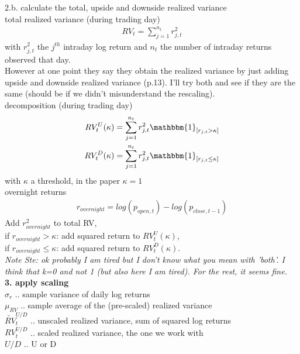 \documentclass{article}
\begin{document}
2.b. calculate the total, upside and downside realized variance\\

total realized variance (during trading day)
\begin{align*}
RV_{t} = \sum_{j = 1}^{n_{t}} r_{j,t}^{2}
\end{align*}
with $r_{j,t}^{2}$ the $j^{th}$ intraday log return and $n_{t}$ the number of intraday returns observed that day. \\

However at one point they say they obtain the realized variance by just adding upside and downside realized variance (p.13). I'll try both and see if they are the same (should be if we didn't misunderstand the rescaling). \\

decomposition (during trading day)
\begin{align*}
RV_{t}^{U}(\kappa) = \sum_{j=1}^{n_{t}} r_{j,t}^{2} \mathbbm{1}_{[r_{j,t} > \kappa]}\\
RV_{t}^{D}(\kappa) = \sum_{j=1}^{n_{t}} r_{j,t}^{2} \mathbbm{1}_{[r_{j,t} \leq \kappa]}
\end{align*}
with $\kappa$ a threshold, in the paper $\kappa = 1$\\

overnight returns
\begin{align*}
r_{overnight} = log(p_{open,t}) - log(p_{close, t-1})
\end{align*}
Add $r_{overnight}^{2}$ to total RV, \\
if $r_{overnight} > \kappa$: add squared return to $RV_{t}^{U}(\kappa)$, \\
if $r_{overnight} \leq \kappa$: add squared return to $RV_{t}^{D}(\kappa)$. \\

\textit{Note Ste:  ok probably I am tired but I don't know what you mean with 'both'. I think that k=0 and not 1 (but also here I am tired). For the rest, it seems fine.}\\


\textbf{3. apply scaling}\\

$\sigma_{r}$ .. sample variance of daily log returns\\
$\mu_{RV}$  .. sample average of the (pre-scaled) realized variance\\
$\tilde{RV}_{t}^{U/D}$ .. unscaled realized variance, sum of squared log returns\\
$RV_{t}^{U/D}$  .. scaled realized variance, the one we work with\\
$U/D$ .. U or D
\end{document}
